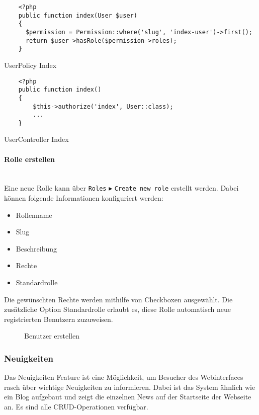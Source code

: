 \begin{listing}[H]
  \begin{verbatim}
    <?php
    public function index(User $user)
    {
      $permission = Permission::where('slug', 'index-user')->first();
      return $user->hasRole($permission->roles);
    }
  \end{verbatim}
  \caption{UserPolicy Index}
\end{listing}

\begin{listing}[H]
  \begin{verbatim}
    <?php
    public function index()
    {
        $this->authorize('index', User::class);
        ...
    }
  \end{verbatim}
  \caption{UserController Index}
\end{listing}

\paragraph{Rolle erstellen}\mbox{}\\
Eine neue Rolle kann über \verb|Roles| $\blacktriangleright$ 
\verb|Create new role| erstellt werden. Dabei können
folgende Informationen konfiguriert werden:

\begin{itemize}
  \item Rollenname
  \item Slug
  \item Beschreibung
  \item Rechte
  \item Standardrolle
\end{itemize}

Die gewünschten Rechte werden mithilfe von Checkboxen ausgewählt. Die
zusätzliche Option Standardrolle erlaubt es, diese Rolle automatisch neue
registrierten Benutzern zuzuweisen.

\begin{figure}[H]
  \centering
  \caption{Benutzer erstellen}
\end{figure}

\subsubsection{Neuigkeiten}
Das Neuigkeiten Feature ist eine Möglichkeit, um Besucher des Webinterfaces
rasch über wichtige Neuigkeiten zu informieren. Dabei ist das System ähnlich
wie ein Blog aufgebaut und zeigt die einzelnen News auf der Startseite der
Webseite an. Es sind alle CRUD-Operationen verfügbar.

